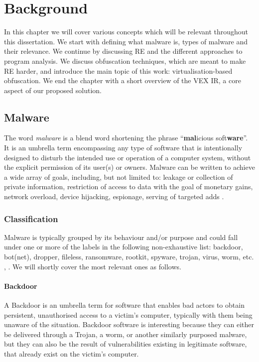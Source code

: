 \chapter{Background}

In this chapter we will cover various concepts which will be relevant throughout this dissertation. We start with defining what malware is, types of malware and their relevance. We continue by discussing \gls{RE} and the different approaches to program analysis. We discuss obfuscation techniques, which are meant to make \gls{RE} harder, and introduce the main topic of this work: virtualisation-based obfuscation. We end the chapter with a short overview of the VEX \gls{IR}, a core aspect of our proposed solution.

\section{Malware}

The word \emph{malware} is a blend word shortening the phrase ``\textbf{mal}icious soft\textbf{ware}''. It is an umbrella term encompassing any type of software that is intentionally designed to disturb the intended use or operation of a computer system, without the explicit permission of its user(s) or owners. Malware can be written to achieve a wide array of goals, including, but not limited to: leakage or collection of private information, restriction of access to data with the goal of monetary gains, network overload, device hijacking, espionage, serving of targeted adds \cite{wiki_malware}.

\subsection{Classification}

Malware is typically grouped by its behaviour and/or purpose and could fall under one or more of the labels in the following non-exhaustive list: backdoor, bot(net), dropper, fileless, ransomware, rootkit, spyware, trojan, virus, worm, etc. \cite{wiki_malware}, \cite{zeusvm}. We will shortly cover the most relevant ones as follows.

\subsubsection{Backdoor}

A Backdoor is an umbrella term for software that enables bad actors to obtain persistent, unauthorised access to a victim's computer, typically with them being unaware of the situation. Backdoor software is  interesting because they can either be delivered through a Trojan, a worm, or another similarly purposed malware, but they can also be the result of vulnerabilities existing in legitimate software, that already exist on the victim's computer. 

